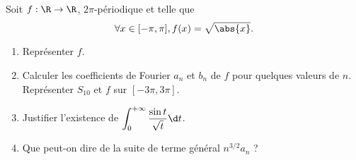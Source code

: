 \begin{enonce}
\begin{exercise}[ID={RMS 122-2 E1096 Centrale PC},subtitle={},tags={}, difficulty={0}]
Soit $f:\R\to\R$, $2\pi$-périodique et telle que
\begin{equation*}
  \forall x\in[-\pi,\pi], f(x)=\sqrt{\abs{x}}.
\end{equation*}
\begin{enumerate}
  \item Représenter $f$.
  \item Calculer les coefficients de Fourier $a_n$ et $b_n$ de $f$ pour quelques valeurs de $n$. Représenter $S_{10}$ et $f$ sur $[-3\pi,3\pi]$.
  \item Justifier l'existence de $\displaystyle\int_0^{+\infty} \frac{\sin t}{\sqrt t}\d t$.
  \item Que peut-on dire de la suite de terme général $n^{3/2}a_n$ ?
\end{enumerate}
\end{exercise}
\begin{solution}
\end{solution}
\end{enonce}
